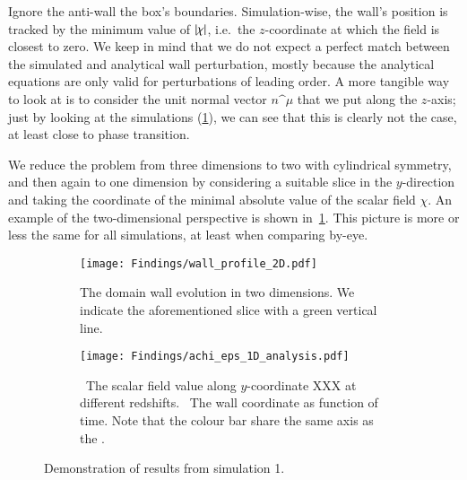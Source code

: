 




Ignore the anti-wall the box's boundaries. 
Simulation-wise, the wall's position is tracked by the minimum value of $\abs{\chi}$, i.e.~the $z$-coordinate at which the field is closest to zero. %
We keep in mind that we do not expect a perfect match between the simulated and analytical wall perturbation, mostly because the analytical equations are only valid for perturbations of leading order. A more tangible way to look at is to consider the unit normal vector $n\^\mu$ that we put along the $z$-axis; just by looking at the simulations (\cref{fig:results:epsilon:wall_profile_2D}), we can see that this is clearly not the case, at least close to phase transition.


We reduce the problem from three dimensions to two with cylindrical symmetry, and then again to one dimension by considering a suitable slice in the $y$-direction and taking the coordinate of the minimal absolute value of the scalar field $\chi$. An example of the two-dimensional perspective is shown in~\cref{fig:results:epsilon:wall_profile_2D}. This picture is more or less the same for all simulations, at least when comparing by-eye.     

\begin{figure}[ht]
    \centering
    \begin{subfigure}[b]{\linewidth}
        \centering
        \texttt{[image: Findings/wall\_profile\_2D.pdf]}
        \caption{The domain wall evolution in two dimensions. We indicate the aforementioned slice with a green vertical line.}
        \label{fig:results:epsilon:wall_profile_2D}
    \end{subfigure}
    \hfill
    \begin{subfigure}[b]{\linewidth}
        \centering
        \texttt{[image: Findings/achi\_eps\_1D\_analysis.pdf]}
        \caption{~The scalar field value along $y$-coordinate XXX at different redshifts. ~The wall coordinate as function of time. Note that the colour bar share the same axis as the \blahblah.}
        \label{fig:results:epsilon:achi_eps_1D_analysis}
    \end{subfigure}
    \caption{Demonstration of results from simulation 1.}
    \label{fig:results:epsilon:from_achi_to_epsilon}
\end{figure}


